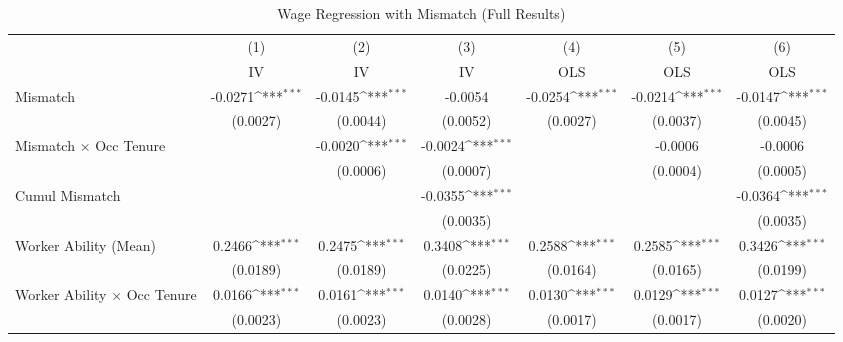 {
\def\sym#1{\ifmmode^{#1}\else\(^{#1}\)\fi}
\begin{longtable}{l*{6}{c}}
\caption{Wage Regression with Mismatch (Full Results)}\\
\hline  \endfirsthead\hline  \endhead\hline  \endfoot\endlastfoot
                    &\multicolumn{1}{c}{(1)}&\multicolumn{1}{c}{(2)}&\multicolumn{1}{c}{(3)}&\multicolumn{1}{c}{(4)}&\multicolumn{1}{c}{(5)}&\multicolumn{1}{c}{(6)}\\
                    &\multicolumn{1}{c}{IV}&\multicolumn{1}{c}{IV}&\multicolumn{1}{c}{IV}&\multicolumn{1}{c}{OLS}&\multicolumn{1}{c}{OLS}&\multicolumn{1}{c}{OLS}\\
\hline  
Mismatch            &     -0.0271\sym{***}&     -0.0145\sym{***}&     -0.0054         &     -0.0254\sym{***}&     -0.0214\sym{***}&     -0.0147\sym{***}\\
                    &    (0.0027)         &    (0.0044)         &    (0.0052)         &    (0.0027)         &    (0.0037)         &    (0.0045)         \\
Mismatch $\times$ Occ Tenure&                     &     -0.0020\sym{***}&     -0.0024\sym{***}&                     &     -0.0006         &     -0.0006         \\
                    &                     &    (0.0006)         &    (0.0007)         &                     &    (0.0004)         &    (0.0005)         \\
Cumul Mismatch      &                     &                     &     -0.0355\sym{***}&                     &                     &     -0.0364\sym{***}\\
                    &                     &                     &    (0.0035)         &                     &                     &    (0.0035)         \\
Worker Ability (Mean)&      0.2466\sym{***}&      0.2475\sym{***}&      0.3408\sym{***}&      0.2588\sym{***}&      0.2585\sym{***}&      0.3426\sym{***}\\
                    &    (0.0189)         &    (0.0189)         &    (0.0225)         &    (0.0164)         &    (0.0165)         &    (0.0199)         \\
Worker Ability $\times$ Occ Tenure&      0.0166\sym{***}&      0.0161\sym{***}&      0.0140\sym{***}&      0.0130\sym{***}&      0.0129\sym{***}&      0.0127\sym{***}\\
                    &    (0.0023)         &    (0.0023)         &    (0.0028)         &    (0.0017)         &    (0.0017)         &    (0.0020)         \\

\end{longtable}}
